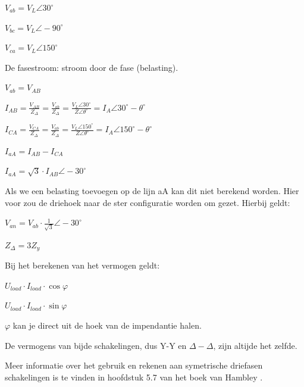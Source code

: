 $V_{ab}=V_L\angle 30^\circ$

$V_{bc}=V_L\angle -90^\circ$

$V_{ca}=V_L\angle 150^\circ$

\vspace{5mm}

De fasestroom: stroom door de fase (belasting).

$V_{ab}=V_{AB}$

$I_{AB}=\frac{V_{AB}}{Z_\Delta}=\frac{V_{ab}}{Z_\Delta}=\frac{V_L \angle 30^\circ}{Z\angle \theta^\circ}=I_A \angle 30^\circ - \theta ^\circ$

$I_{CA}=\frac{V_{CA}}{Z_\Delta}=\frac{V_{ab}}{Z_\Delta}=\frac{V_L \angle 150^\circ}{Z\angle \theta^\circ}=I_A \angle 150^\circ - \theta ^\circ$

$I_{aA}=I_{AB}-I_{CA}$

$I_{aA}=\sqrt{3}\cdot I_{AB} \angle -30^\circ$

\vspace{5mm}

Als we een belasting toevoegen op de lijn aA kan dit niet berekend worden. Hier voor zou de driehoek naar de ster configuratie
worden om gezet. Hierbij geldt:

$V_{an}=V_{ab}\cdot \frac{1}{\sqrt{3}}\angle -30^\circ$

$Z_\Delta =3Z_y$

\vspace{5mm}

Bij het berekenen van het vermogen geldt: 

$U_{load}\cdot I_{load} \cdot \cos \varphi$

$U_{load}\cdot I_{load} \cdot \sin \varphi$

$\varphi$ kan je direct uit de hoek van de impendantie halen.

\vspace{5mm}

De vermogens van bijde schakelingen, dus Y-Y en $\Delta - \Delta$, zijn altijde het zelfde.

Meer informatie over het gebruik en rekenen aan symetrische driefasen schakelingen is te vinden in hoofdstuk 5.7 van het 
boek van Hambley \cite{leerboek}.